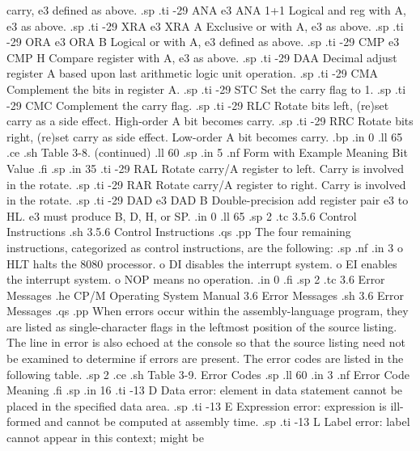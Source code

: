 carry, e3 defined as above.
.sp
.ti -29
ANA e3         ANA 1+1       Logical and reg with A, e3 as 
above.
.sp
.ti -29
XRA e3         XRA A         Exclusive or with A, e3 as above.
.sp
.ti -29
ORA e3         ORA B         Logical or with A, e3 defined as 
above.
.sp
.ti -29
CMP e3         CMP H         Compare register with A, e3 as 
above.
.sp
.ti -29
DAA                          Decimal adjust register A based 
upon last arithmetic logic unit operation.
.sp
.ti -29
CMA                          Complement the bits in register A.
.sp
.ti -29
STC                          Set the carry flag to 1.
.sp
.ti -29
CMC                          Complement the carry flag.
.sp
.ti -29
RLC                          Rotate bits left, (re)set carry as a 
side effect.  High-order A bit becomes carry.
.sp
.ti -29
RRC                          Rotate bits right, (re)set carry as 
side effect.  Low-order A bit becomes carry.
.bp
.in 0
.ll 65
.ce
.sh
Table 3-8.  (continued)
.ll 60
.sp
.in 5
.nf
Form with       Example                Meaning
Bit Value
.fi
.sp
.in 35
.ti -29
RAL                          Rotate carry/A register to left.  
Carry is involved in the rotate.
.sp
.ti -29
RAR                          Rotate carry/A register to right.  
Carry is involved in the rotate.
.sp
.ti -29
DAD e3         DAD B         Double-precision add register pair 
e3 to HL.  e3 must produce B, D, H, or SP.
.in 0
.ll 65
.sp 2
.tc         3.5.6  Control Instructions
.sh
3.5.6  Control Instructions
.qs
.pp
The four remaining instructions, categorized as control instructions, are 
the following:
.sp
.nf 
.in 3
o HLT halts the 8080 processor.
o DI disables the interrupt system.
o EI enables the interrupt system.
o NOP means no operation.
.in 0
.fi
.sp 2
.tc    3.6  Error Messages
.he CP/M Operating System Manual                  3.6  Error Messages
.sh
3.6  Error Messages
.qs
.pp
When errors occur within the assembly-language program, they are 
listed as single-character flags in the leftmost position of the 
source listing.  The line in error is also echoed at the console 
so that the source listing need not be examined to determine if 
errors are present.  The error codes are listed in the following 
table.
.sp 2
.ce
.sh
Table 3-9.  Error Codes
.sp
.ll 60
.in 3
.nf
Error Code                       Meaning
.fi
.sp
.in 16
.ti -13
D            Data error:  element in data statement cannot be placed in 
the specified data area.
.sp
.ti -13
E            Expression error:  expression is ill-formed and cannot be 
computed at assembly time.
.sp
.ti -13
L            Label error:  label cannot appear in this context; might be 
